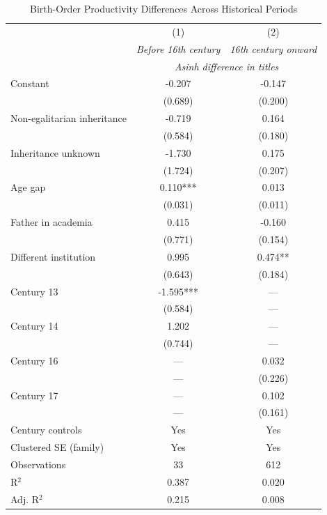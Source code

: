\begin{table}[H]
\centering
\caption{Birth-Order Productivity Differences Across Historical Periods}
\label{tab:period_regressions}

\begin{tablebody}
\begin{tabular}{l c c}
\toprule
 & (1) & (2) \\
 & \textit{Before 16th century} & \textit{16th century onward} \\
\midrule
 & \multicolumn{2}{c}{\textit{Asinh difference in titles}} \\
\midrule

Constant
& -0.207 & -0.147 \\
& (0.689) & (0.200) \\

Non-egalitarian inheritance
& -0.719 & 0.164 \\
& (0.584) & (0.180) \\

Inheritance unknown
& -1.730 & 0.175 \\
& (1.724) & (0.207) \\

Age gap
& 0.110*** & 0.013 \\
& (0.031) & (0.011) \\

Father in academia
& 0.415 & -0.160 \\
& (0.771) & (0.154) \\

Different institution
& 0.995 & 0.474** \\
& (0.643) & (0.184) \\

Century 13
& -1.595*** & --- \\
& (0.584) & --- \\

Century 14
& 1.202 & --- \\
& (0.744) & --- \\

Century 16
& --- & 0.032 \\
& --- & (0.226) \\

Century 17
& --- & 0.102 \\
& --- & (0.161) \\

\midrule
Century controls & Yes & Yes \\
Clustered SE (family) & Yes & Yes \\
\midrule
Observations & 33 & 612 \\
R$^{2}$ & 0.387 & 0.020 \\
Adj. R$^{2}$ & 0.215 & 0.008 \\
\bottomrule
\end{tabular}
\end{tablebody}


\end{table}
